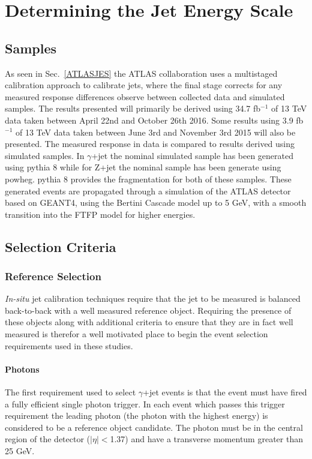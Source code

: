 \chapter{Determining the Jet Energy Scale}
\label{JES2}

\section{Samples}
As seen in Sec.~\ref{ATLASJES} the ATLAS collaboration uses a multistaged calibration approach to calibrate jets, where the final stage corrects for any measured response differences observe between collected data and simulated samples.  
The results presented will primarily be derived using 34.7 fb$^{-1}$ of 13 TeV data taken between April 22nd and October 26th 2016. 
Some results using 3.9 fb$^{-1}$ of 13 TeV data taken between June 3rd and November 3rd 2015 will also be presented.  
The measured response in data is compared to results derived using simulated samples.  
In $\gamma$+jet the nominal simulated sample has been generated using {\sc pythia} 8 while for Z+jet the nominal sample has been generate using {\sc powheg}.  
{\sc pythia} 8 provides the fragmentation for both of these samples.  
These generated events are propagated through a simulation of the ATLAS detector based on GEANT4, using the Bertini Cascade model up to 5 GeV, with a smooth transition into the FTFP model for higher energies.  


\section{Selection Criteria}

\subsection{Reference Selection}
{\textit{In-situ}} jet calibration techniques require that the jet to be measured is balanced back-to-back with a well measured reference object.  
Requiring the presence of these objects along with additional criteria to ensure that they are in fact well measured is therefor a well motivated place to begin the event selection requirements used in these studies.  

\subsubsection{Photons}
The first requirement used to select $\gamma$+jet events is that the event must have fired a fully efficient single photon trigger.  
In each event which passes this trigger requirement the leading photon (the photon with the highest energy) is considered to be a reference object candidate.  
The photon must be in the central region of the detector ($\mid\eta\mid<$1.37) and have a transverse momentum greater than 25 GeV.  
 
